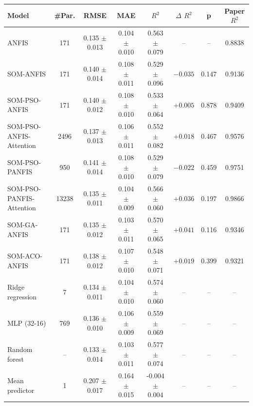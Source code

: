 \begin{tabular}{lccccccc}
\hline
Model & \#Par. & RMSE & MAE & $R^2$ & $\Delta$ $R^2$ & p & Paper $R^2$ \\
\hline
ANFIS & 171 & 0.135 $\pm$ 0.013 & 0.104 $\pm$ 0.010 & 0.563 $\pm$ 0.079 & -- & -- & 0.8838 \\
SOM-ANFIS & 171 & 0.140 $\pm$ 0.014 & 0.108 $\pm$ 0.011 & 0.529 $\pm$ 0.096 & $-0.035$ & 0.147 & 0.9136 \\
SOM-PSO-ANFIS & 171 & 0.140 $\pm$ 0.012 & 0.108 $\pm$ 0.010 & 0.533 $\pm$ 0.064 & $+0.005$ & 0.878 & 0.9409 \\
SOM-PSO-ANFIS-Attention & 2496 & 0.137 $\pm$ 0.013 & 0.106 $\pm$ 0.011 & 0.552 $\pm$ 0.082 & $+0.018$ & 0.467 & 0.9576 \\
SOM-PSO-PANFIS & 950 & 0.141 $\pm$ 0.014 & 0.108 $\pm$ 0.010 & 0.529 $\pm$ 0.079 & $-0.022$ & 0.459 & 0.9751 \\
SOM-PSO-PANFIS-Attention & 13238 & 0.135 $\pm$ 0.011 & 0.104 $\pm$ 0.009 & 0.566 $\pm$ 0.060 & $+0.036$ & 0.197 & 0.9866 \\
\hline
SOM-GA-ANFIS & 171 & 0.135 $\pm$ 0.012 & 0.103 $\pm$ 0.011 & 0.570 $\pm$ 0.065 & $+0.041$ & 0.116 & 0.9346 \\
SOM-ACO-ANFIS & 171 & 0.138 $\pm$ 0.012 & 0.107 $\pm$ 0.010 & 0.548 $\pm$ 0.071 & $+0.019$ & 0.399 & 0.9321 \\
\hline
Ridge regression & 7 & 0.134 $\pm$ 0.011 & 0.104 $\pm$ 0.010 & 0.574 $\pm$ 0.060 & -- & -- & -- \\
MLP (32-16) & 769 & 0.136 $\pm$ 0.010 & 0.106 $\pm$ 0.009 & 0.559 $\pm$ 0.069 & -- & -- & -- \\
Random forest & -- & 0.133 $\pm$ 0.014 & 0.103 $\pm$ 0.011 & 0.577 $\pm$ 0.074 & -- & -- & -- \\
Mean predictor & 1 & 0.207 $\pm$ 0.017 & 0.164 $\pm$ 0.015 & -0.004 $\pm$ 0.004 & -- & -- & -- \\
\hline
\end{tabular}
